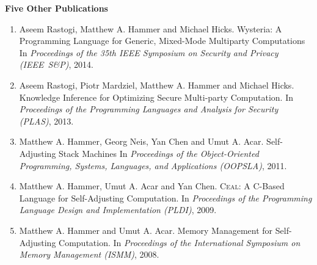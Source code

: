 \documentclass[letterpaper]{article}
\newcommand{\fconf}[1]{In \emph{Proceedings of the #1}}
\newcommand{\fme}[1]{#1}
\begin{document}
\clearpage
{\bf Five Other Publications}
\begin{enumerate}\itemsep 0pt

\item
  Aseem Rastogi, \fme{Matthew A. Hammer} and Michael Hicks.
  Wysteria: A Programming Language for Generic, Mixed-Mode Multiparty Computations
  \fconf{35th IEEE Symposium on Security and Privacy (IEEE~S\&P)}, 2014.

\item
  Aseem Rastogi, Piotr Mardziel, \fme{Matthew A. Hammer} and Michael Hicks.
  Knowledge Inference for Optimizing Secure Multi-party Computation.
  \fconf{Programming Languages and Analysis for Security (PLAS)}, 2013.


\item
  \fme{Matthew A. Hammer}, Georg Neis, Yan Chen and Umut A. Acar.
  Self-Adjusting Stack Machines
  \fconf{Object-Oriented Programming, Systems, Languages, and Applications (OOPSLA)},
  2011.

  
\item
  \fme{Matthew A. Hammer}, Umut A. Acar and Yan Chen.
  \textsc{Ceal}: A C-Based Language for Self-Adjusting Computation.
  \fconf{Programming Language Design and Implementation (PLDI)}, 2009.


\item
  \fme{Matthew A. Hammer} and Umut A. Acar.
  Memory Management for Self-Adjusting Computation.
  \fconf{International Symposium on Memory Management (ISMM)}, 2008.
  


\end{enumerate}
\end{document}
